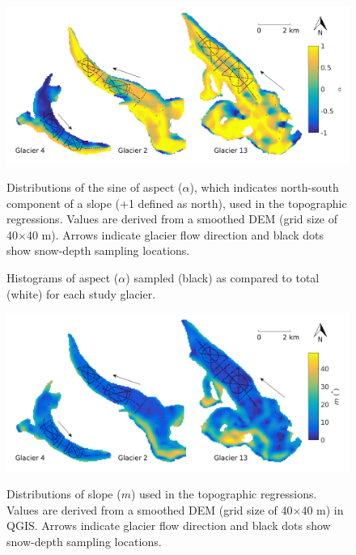 \documentclass{sfuthesis}
\newcommand{\topomap}{Arrows indicate glacier flow direction and black dots show snow-depth sampling locations. }
\begin{document}
{\begin{figure}[H]
	\centering
	\includegraphics[width=\textwidth]{Map_aspect.png}\\
	\caption[Distributions of the sine of aspect ($\alpha$)]{Distributions of the sine of aspect ($\alpha$), which indicates north-south component of a slope (+1 defined as north), used in the topographic regressions. Values are derived from a smoothed DEM (grid size of 40$\times$40 m). \topomap}
	\label{map:aspect}
\end{figure}

\begin{figure}[H]
	\caption[Histograms of full and sampled aspect ($\alpha$)]{Histograms of aspect ($\alpha$) sampled (black) as compared to total (white) for each study glacier.}
	\label{sampledRange:aspect}
\end{figure}

\begin{figure}[H]
	\centering
	\includegraphics[width=\textwidth]{Map_slope.png}\\
	\caption[Distributions of slope ($m$)]{Distributions of slope ($m$) used in the topographic regressions. Values are derived from a smoothed DEM (grid size of 40$\times$40 m) in QGIS. \topomap}
	\label{map:slope}
\end{figure}

}
\end{document}

